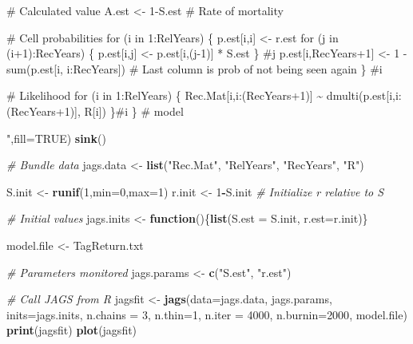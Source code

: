 \documentclass[
]{krantz}
\makeatletter
\newenvironment{Shaded}{\begin{snugshade}}{\end{snugshade}}
\newcommand{\AttributeTok}[1]{\textcolor[rgb]{0.27,0.27,0.27}{#1}}
\newcommand{\CommentTok}[1]{\textcolor[rgb]{0.37,0.37,0.37}{\textit{#1}}}
\newcommand{\ConstantTok}[1]{\textcolor[rgb]{0.37,0.37,0.37}{#1}}
\newcommand{\ControlFlowTok}[1]{\textcolor[rgb]{0.27,0.27,0.27}{\textbf{#1}}}
\newcommand{\DecValTok}[1]{\textcolor[rgb]{0.06,0.06,0.06}{#1}}
\newcommand{\FunctionTok}[1]{\textcolor[rgb]{0.27,0.27,0.27}{\textbf{#1}}}
\newcommand{\NormalTok}[1]{#1}
\newcommand{\OtherTok}[1]{\textcolor[rgb]{0.37,0.37,0.37}{#1}}
\newcommand{\SpecialCharTok}[1]{\textcolor[rgb]{0.43,0.43,0.43}{\textbf{#1}}}
\newcommand{\StringTok}[1]{\textcolor[rgb]{0.5,0.5,0.5}{#1}}
\newenvironment{kframe}{%
\medskip{}
\setlength{\fboxsep}{.8em}
 \def\at@end@of@kframe{}%
 \ifinner\ifhmode%
  \def\at@end@of@kframe{\end{minipage}}%
  \begin{minipage}{\columnwidth}%
 \fi\fi%
 \def\FrameCommand##1{\hskip\@totalleftmargin \hskip-\fboxsep
 \colorbox{shadecolor}{##1}\hskip-\fboxsep
     \hskip-\linewidth \hskip-\@totalleftmargin \hskip\columnwidth}%
 \MakeFramed {\advance\hsize-\width
   \@totalleftmargin\z@ \linewidth\hsize
   \@setminipage}}%
 {\par\unskip\endMakeFramed%
 \at@end@of@kframe}
\renewenvironment{Shaded}{\begin{kframe}}{\end{kframe}}
\makeatother
\begin{document}
\begin{Shaded}
\begin{Highlighting}[]
\StringTok{  \# Calculated value}
\StringTok{  A.est \textless{}{-} 1{-}S.est \# Rate of mortality}

\StringTok{\# Cell probabilities}
\StringTok{for (i in 1:RelYears) \{}
\StringTok{   p.est[i,i] \textless{}{-} r.est}
\StringTok{   for (j in (i+1):RecYears) \{}
\StringTok{      p.est[i,j] \textless{}{-} p.est[i,(j{-}1)] * S.est}
\StringTok{      \} \#j}
\StringTok{    p.est[i,RecYears+1] \textless{}{-} 1 {-} sum(p.est[i, i:RecYears])}
\StringTok{    \# Last column is prob of not being seen again}
\StringTok{    \} \#i}

\StringTok{\# Likelihood}
\StringTok{  for (i in 1:RelYears) \{}
\StringTok{    Rec.Mat[i,i:(RecYears+1)] \textasciitilde{} dmulti(p.est[i,i:(RecYears+1)], R[i])}
\StringTok{    \}\#i}
\StringTok{ \} \# model}

\StringTok{"}\NormalTok{,}\AttributeTok{fill=}\ConstantTok{TRUE}\NormalTok{)}
\FunctionTok{sink}\NormalTok{()}

\CommentTok{\# Bundle data}
\NormalTok{jags.data }\OtherTok{\textless{}{-}} \FunctionTok{list}\NormalTok{(}\StringTok{"Rec.Mat"}\NormalTok{, }\StringTok{"RelYears"}\NormalTok{, }\StringTok{"RecYears"}\NormalTok{, }\StringTok{"R"}\NormalTok{)}

\NormalTok{S.init }\OtherTok{\textless{}{-}} \FunctionTok{runif}\NormalTok{(}\DecValTok{1}\NormalTok{,}\AttributeTok{min=}\DecValTok{0}\NormalTok{,}\AttributeTok{max=}\DecValTok{1}\NormalTok{)}
\NormalTok{r.init }\OtherTok{\textless{}{-}} \DecValTok{1}\SpecialCharTok{{-}}\NormalTok{S.init  }\CommentTok{\# Initialize r relative to S}

\CommentTok{\# Initial values}
\NormalTok{jags.inits }\OtherTok{\textless{}{-}} \ControlFlowTok{function}\NormalTok{()\{}\FunctionTok{list}\NormalTok{(}\AttributeTok{S.est =}\NormalTok{ S.init, }\AttributeTok{r.est=}\NormalTok{r.init)\}}

\NormalTok{model.file }\OtherTok{\textless{}{-}} \StringTok{\textquotesingle{}TagReturn.txt\textquotesingle{}}

\CommentTok{\# Parameters monitored}
\NormalTok{jags.params }\OtherTok{\textless{}{-}} \FunctionTok{c}\NormalTok{(}\StringTok{"S.est"}\NormalTok{, }\StringTok{"r.est"}\NormalTok{)}

\CommentTok{\# Call JAGS from R}
\NormalTok{jagsfit }\OtherTok{\textless{}{-}} \FunctionTok{jags}\NormalTok{(}\AttributeTok{data=}\NormalTok{jags.data, jags.params, }\AttributeTok{inits=}\NormalTok{jags.inits,}
                \AttributeTok{n.chains =} \DecValTok{3}\NormalTok{, }\AttributeTok{n.thin=}\DecValTok{1}\NormalTok{, }\AttributeTok{n.iter =} \DecValTok{4000}\NormalTok{, }\AttributeTok{n.burnin=}\DecValTok{2000}\NormalTok{,}
\NormalTok{                model.file)}
\FunctionTok{print}\NormalTok{(jagsfit)}
\FunctionTok{plot}\NormalTok{(jagsfit)}
\end{Highlighting}
\end{Shaded}
\end{document}
